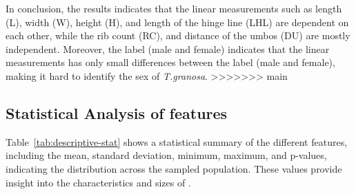 In conclusion, the results indicates that the linear measurements such as length (L), width (W), height (H), and length of the hinge line (LHL) are dependent on each other, while the rib count (RC), and distance of the umbos (DU) are mostly independent. Moreover, the label (male and female) indicates that the linear measurements has only small differences between the label (male and female), making it hard to identify the sex of \textit{T.granosa}.
>>>>>>> main

\subsection{Statistical Analysis of \Tgranosa features}

\begin{table}[H]
	\centering
	{\fontsize{8}{10}\selectfont 
	}
	\caption{ Dataset Overview and Exploration}
	\label{tab:descriptive-stat}
\end{table}

Table~\ref{tab:descriptive-stat} shows a statistical summary of the different features, including the mean, standard deviation, minimum, maximum, and p-values, indicating the distribution across the sampled population. These values provide insight into the characteristics and sizes of  \Tgranosa. 

